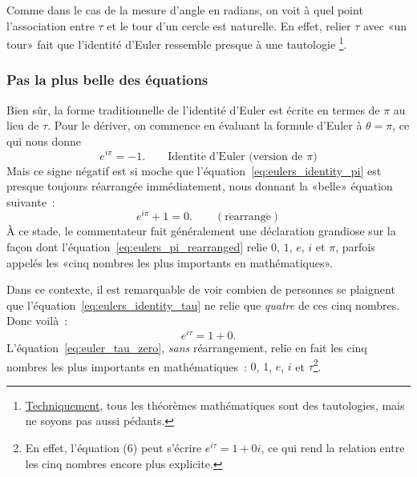 Comme dans le cas de la mesure d'angle en radians, on voit à quel point
l'association entre $\tau$ et le tour d'un cercle est naturelle. En effet,
relier $\tau$ avec «\ns un tour\ns » fait que l'identité d'Euler
ressemble presque à une
tautologie\ns
\footnote{\href{https://translate.google.com/translate?hl=en&sl=en&tl=fr&u=https://www.explainxkcd.com/wiki/index.php/1475:_Technically}{Techniquement},
tous les
théorèmes mathématiques sont des tautologies, mais ne soyons pas aussi
pédants.}.

    \subsubsection{Pas la plus belle des équations} %
    \label{sec:not_the_most_beautiful_equation}

Bien sûr, la forme traditionnelle de l'identité d'Euler est écrite en termes de
$\pi$ au lieu de $\tau$. Pour le dériver, on commence en évaluant la formule
d'Euler à $\theta = \pi$, ce qui nous donne
\begin{equation}
\label{eq:eulers_identity_pi}
e^{i\pi} = -1. \qquad\mathrm{Identit\acute{e}}\; \mbox{d'Euler (version de $\pi$)}
\end{equation}
\noindent Mais ce signe négatif est si moche que
l'équation~\eqref{eq:eulers_identity_pi} est presque toujours réarrangée
immédiatement, nous donnant la «\ns belle\ns » équation suivante~:
\begin{equation}
\label{eq:eulers_pi_rearranged}
e^{i\pi} + 1 = 0. \qquad\mathrm{(r\acute{e}arrang\acute{e})}
\end{equation}
À ce stade, le commentateur fait généralement une déclaration grandiose sur la façon
dont l'équation~\eqref{eq:eulers_pi_rearranged} relie $0$, $1$, $e$, $i$ et
$\pi$, parfois appelés les «\ns cinq nombres les plus importants en
mathématiques\ns ».

Dans ce contexte, il est remarquable de voir combien de personnes se plaignent
que l'équation~\eqref{eq:eulers_identity_tau} ne relie que \emph{quatre} de ces
cinq nombres. Donc voilà~:
\begin{equation}
\label{eq:euler_tau_zero}
e^{i\tau} = 1 + 0.
\end{equation}
L'équation~\eqref{eq:euler_tau_zero}, \emph{sans} réarrangement, relie en fait
les cinq nombres les plus importants en mathématiques~: $0$, $1$, $e$, $i$ et
$\tau$\ns\footnote{En effet, l'équation (6) peut s'écrire $e^{i\tau} = 1 + 0i$,
ce qui rend la relation entre les cinq nombres encore plus explicite.}.

